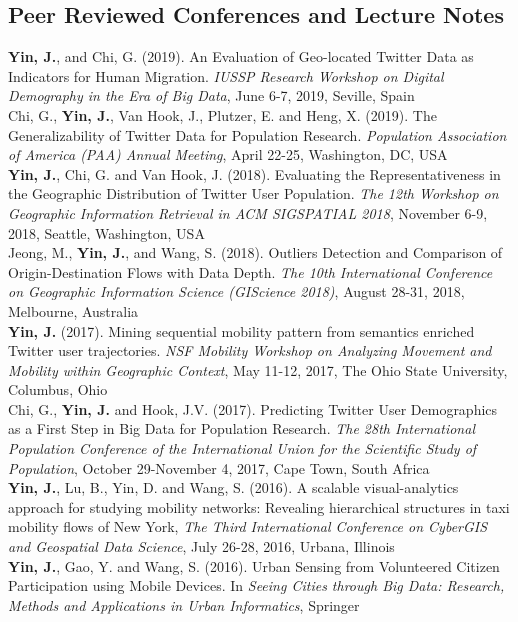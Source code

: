 \documentclass[11pt, a4paper]{article}
\newcommand{\years}[1]{\marginnote{\scriptsize #1}}
\begin{document}
\subsection*{Peer Reviewed Conferences and Lecture Notes}
\noindent
\years{2019}\textbf{Yin, J.}, and Chi, G. (2019). An Evaluation of Geo-located Twitter Data as Indicators for Human Migration. \textit{IUSSP Research Workshop on Digital Demography in the Era of Big Data}, June 6-7, 2019, Seville, Spain\\
\years{2019}Chi, G., \textbf{Yin, J.}, Van Hook, J., Plutzer, E. and Heng, X. (2019). The Generalizability of Twitter Data for Population Research. \textit{Population Association of America (PAA) Annual Meeting}, April 22-25, Washington, DC, USA\\
\years{2018}\textbf{Yin, J.}, Chi, G. and Van Hook, J. (2018). Evaluating the Representativeness in the Geographic Distribution of Twitter User Population. \textit{The 12th Workshop on Geographic Information Retrieval in ACM SIGSPATIAL 2018}, November 6-9, 2018, Seattle, Washington, USA\\
\years{2018}Jeong, M., \textbf{Yin, J.}, and Wang, S. (2018). Outliers Detection and Comparison of Origin-Destination Flows with Data Depth. \textit{The 10th International Conference on Geographic Information Science (GIScience 2018)}, August 28-31, 2018, Melbourne, Australia\\
\years{2017}\textbf{Yin, J.} (2017). Mining sequential mobility pattern from semantics enriched Twitter user trajectories. \textit{NSF Mobility Workshop on Analyzing Movement and Mobility within Geographic Context}, May 11-12, 2017, The Ohio State University, Columbus, Ohio\\
\years{2017}Chi, G., \textbf{Yin, J.} and Hook, J.V. (2017). Predicting Twitter User Demographics as a First Step in Big Data for Population Research. \textit{The 28th International Population Conference of the International Union for the Scientific Study of Population}, October 29-November 4, 2017, Cape Town, South Africa\\
\years{2016}\textbf{Yin, J.}, Lu, B., Yin, D. and Wang, S. (2016). A scalable visual-analytics approach for studying mobility networks: Revealing hierarchical structures in taxi mobility flows of New York, \textit{The Third International Conference on CyberGIS and Geospatial Data Science}, July 26-28, 2016, Urbana, Illinois\\
\years{2016}\textbf{Yin, J.}, Gao, Y. and Wang, S. (2016). Urban Sensing from Volunteered Citizen Participation using Mobile Devices. In \emph{Seeing Cities through Big Data: Research, Methods and Applications in Urban Informatics}, Springer\\
\end{document}
